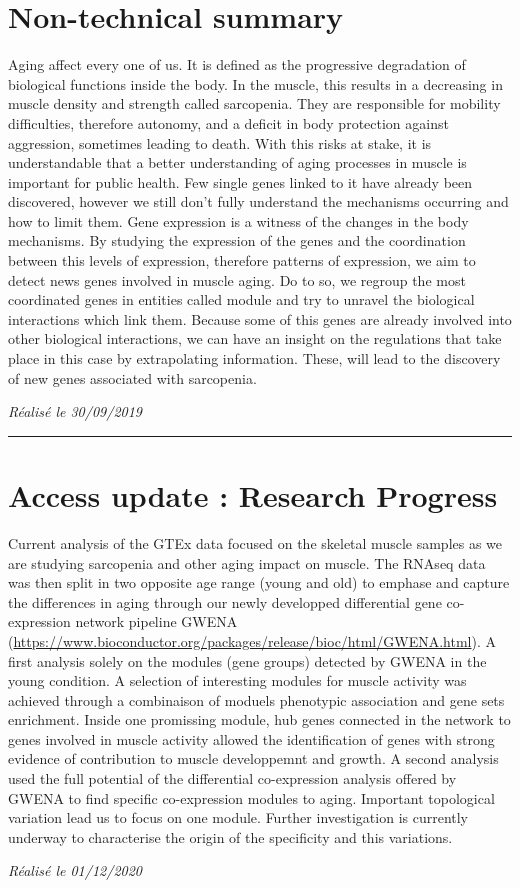\section{Non-technical summary}
Aging affect every one of us. It is defined as the progressive degradation of biological functions inside the body. In the muscle, this results in a decreasing in muscle density and strength called sarcopenia. They are responsible for mobility difficulties, therefore autonomy, and a deficit in body protection against aggression, sometimes leading to death. With this risks at stake, it is understandable that a better understanding of aging processes in muscle is important for public health. Few single genes linked to it have already been discovered, however we still don't fully understand the mechanisms occurring and how to limit them. Gene expression is a witness of the changes in the body mechanisms. By studying the expression of the genes and the coordination between this levels of expression, therefore patterns of expression, we aim to detect news genes involved in muscle aging. Do to so, we regroup the most coordinated genes in entities called module and try to unravel the biological interactions which link them. Because some of this genes are already involved into other biological interactions, we can have an insight on the regulations that take place in this case by extrapolating information. These, will lead to the discovery of new genes associated with sarcopenia.

\hfill \break
\textit{Réalisé le 30/09/2019}

\textcolor[RGB]{220,220,220}{\rule{\linewidth}{0.2pt}}

\section{Access update : Research Progress}
Current analysis of the GTEx data focused on the skeletal muscle samples as we are studying sarcopenia and other aging impact on muscle. The RNAseq data was then split in two opposite age range (young and old) to emphase and capture the differences in aging through our newly developped differential gene co-expression network pipeline GWENA (\url{https://www.bioconductor.org/packages/release/bioc/html/GWENA.html}). 
A first analysis solely on the modules (gene groups) detected by GWENA in the young condition. A selection of interesting modules for muscle activity was achieved through a combinaison of moduels phenotypic association and gene sets enrichment. Inside one promissing module, hub genes connected in the network to genes involved in muscle activity allowed the identification of genes with strong evidence of contribution to muscle developpemnt and growth.
A second analysis used the full potential of the differential co-expression analysis offered by GWENA to find specific co-expression modules to aging. Important topological variation lead us to focus on one module. Further investigation is currently underway to characterise the origin of the specificity and this variations. 

\hfill \break
\textit{Réalisé le 01/12/2020}